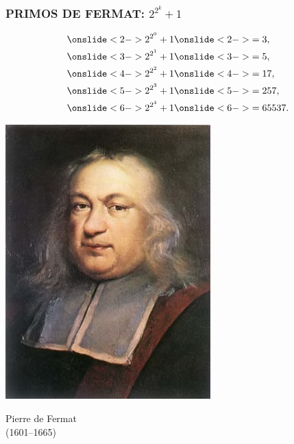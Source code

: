 \begin{frame}
  \frametitle{PRIMOS DE FERMAT: $2^{2^k} + 1$}

  \begin{minipage}[t][0.6\textheight]{0.6\textwidth}
    \begin{align*}
      \onslide<2->{2^{2^0} + 1} & \onslide<2->{= 3,} \\
      \onslide<3->{2^{2^1} + 1} & \onslide<3->{= 5,} \\
      \onslide<4->{2^{2^2} + 1} & \onslide<4->{= 17,} \\
      \onslide<5->{2^{2^3} + 1} & \onslide<5->{= 257,} \\
      \onslide<6->{2^{2^4} + 1} & \onslide<6->{= 65537.} \\
    \end{align*}
  \end{minipage}
  \begin{minipage}[t]{0.35\textwidth}
    \vspace{0pt}\flushright
    \includegraphics[width=.9\textwidth]{pic/fermat.jpg}

    Pierre de Fermat\\
    (1601--1665)
  \end{minipage}
\end{frame}

